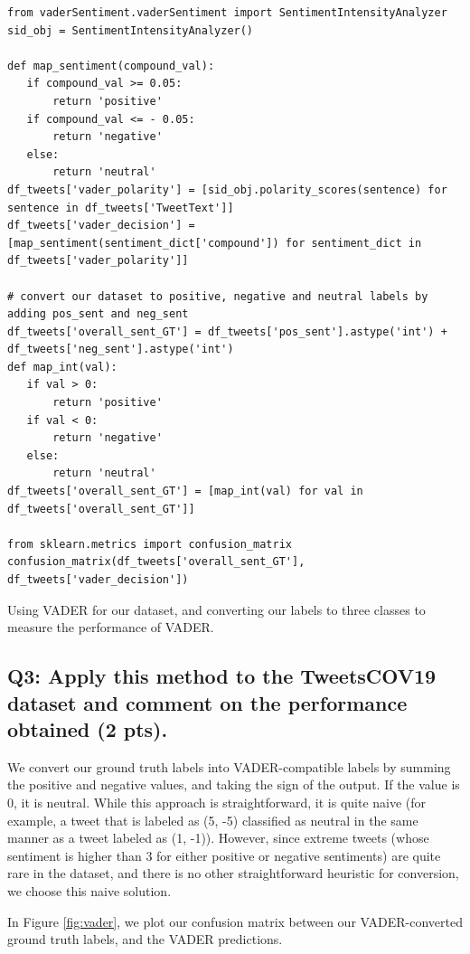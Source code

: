 \begin{listing*}
\begin{verbatim}
from vaderSentiment.vaderSentiment import SentimentIntensityAnalyzer
sid_obj = SentimentIntensityAnalyzer()

def map_sentiment(compound_val):
   if compound_val >= 0.05:
       return 'positive'
   if compound_val <= - 0.05:
       return 'negative'
   else:
       return 'neutral'
df_tweets['vader_polarity'] = [sid_obj.polarity_scores(sentence) for sentence in df_tweets['TweetText']]
df_tweets['vader_decision'] = [map_sentiment(sentiment_dict['compound']) for sentiment_dict in df_tweets['vader_polarity']]

# convert our dataset to positive, negative and neutral labels by adding pos_sent and neg_sent
df_tweets['overall_sent_GT'] = df_tweets['pos_sent'].astype('int') + df_tweets['neg_sent'].astype('int')
def map_int(val):
   if val > 0:
       return 'positive'
   if val < 0:
       return 'negative'
   else:
       return 'neutral'
df_tweets['overall_sent_GT'] = [map_int(val) for val in df_tweets['overall_sent_GT']]

from sklearn.metrics import confusion_matrix
confusion_matrix(df_tweets['overall_sent_GT'], df_tweets['vader_decision'])
\end{verbatim}
\caption{Using VADER for our dataset, and converting our labels to three classes to measure the performance of VADER.}
\label{listing:p2-code1}
\end{listing*}


\subsection*{Q3: Apply this method to the TweetsCOV19 dataset and comment on the performance obtained (2 pts).}

We convert our ground truth labels into VADER-compatible labels by summing the positive and negative values, and taking the sign of the output. If the value is 0, it is neutral. While this approach is straightforward, it is quite naive (for example, a tweet that is labeled as (5, -5) classified as neutral in the same manner as a tweet labeled as (1, -1)). However, since extreme tweets (whose sentiment is higher than 3 for either positive or negative sentiments) are quite rare in the dataset, and there is no other straightforward heuristic for conversion, we choose this naive solution.

In Figure \ref{fig:vader}, we plot our confusion matrix between our VADER-converted ground truth labels, and the VADER predictions. 

